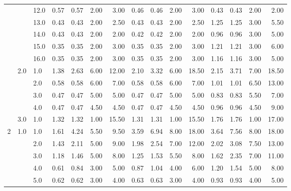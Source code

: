 \begin{tabular}{lllrrrrrrrrrrrr}
     &     & 12.0 &       0.57 &      0.57 & 2.00 &   3.00 &       0.46 &      0.46 & 2.00 &   3.00 &       0.43 &      0.43 & 2.00 &   2.00 \\
     &     & 13.0 &       0.43 &      0.43 & 2.00 &   2.50 &       0.43 &      0.43 & 2.00 &   2.50 &       1.25 &      1.25 & 3.00 &   5.50 \\
     &     & 14.0 &       0.43 &      0.43 & 2.00 &   2.00 &       0.42 &      0.42 & 2.00 &   2.00 &       0.96 &      0.96 & 3.00 &   5.00 \\
     &     & 15.0 &       0.35 &      0.35 & 2.00 &   3.00 &       0.35 &      0.35 & 2.00 &   3.00 &       1.21 &      1.21 & 3.00 &   6.00 \\
     &     & 16.0 &       0.35 &      0.35 & 2.00 &   3.00 &       0.35 &      0.35 & 2.00 &   3.00 &       1.16 &      1.16 & 3.00 &   5.00 \\
     & 2.0 & 1.0  &       1.38 &      2.63 & 6.00 &  12.00 &       2.10 &      3.32 & 6.00 &  18.50 &       2.15 &      3.71 & 7.00 &  18.50 \\
     &     & 2.0  &       0.58 &      0.58 & 6.00 &   7.00 &       0.58 &      0.58 & 6.00 &   7.00 &       1.01 &      1.01 & 6.50 &  13.00 \\
     &     & 3.0  &       0.47 &      0.47 & 5.00 &   5.00 &       0.47 &      0.47 & 5.00 &   5.00 &       0.83 &      0.83 & 5.50 &   7.00 \\
     &     & 4.0  &       0.47 &      0.47 & 4.50 &   4.50 &       0.47 &      0.47 & 4.50 &   4.50 &       0.96 &      0.96 & 4.50 &   9.00 \\
     & 3.0 & 1.0  &       1.32 &      1.32 & 1.00 &  15.50 &       1.31 &      1.31 & 1.00 &  15.50 &       1.76 &      1.76 & 1.00 &  17.00 \\
2 & 1.0 & 1.0  &       1.61 &      4.24 & 5.50 &   9.50 &       3.59 &      6.94 & 8.00 &  18.00 &       3.64 &      7.56 & 8.00 &  18.00 \\
     &     & 2.0  &       1.43 &      2.11 & 5.00 &   9.00 &       1.98 &      2.54 & 7.00 &  12.00 &       2.02 &      3.08 & 7.50 &  13.00 \\
     &     & 3.0  &       1.18 &      1.46 & 5.00 &   8.00 &       1.25 &      1.53 & 5.50 &   8.00 &       1.62 &      2.35 & 7.00 &  11.00 \\
     &     & 4.0  &       0.61 &      0.84 & 3.00 &   5.00 &       0.87 &      1.04 & 4.00 &   6.00 &       1.20 &      1.54 & 5.00 &   8.00 \\
     &     & 5.0  &       0.62 &      0.62 & 3.00 &   4.00 &       0.63 &      0.63 & 3.00 &   4.00 &       0.93 &      0.93 & 4.00 &   5.00 \\

\end{tabular}

